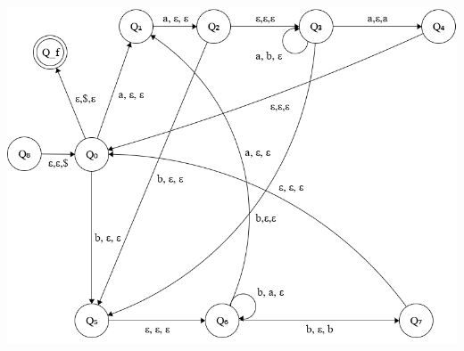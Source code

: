 \documentclass{article}
\begin{document}
\begin{enumerate}
\begin{verbatim}
				\end{verbatim}
				\includegraphics[width=\textwidth]{p3.png}\\

	\end{enumerate}
\end{document}
